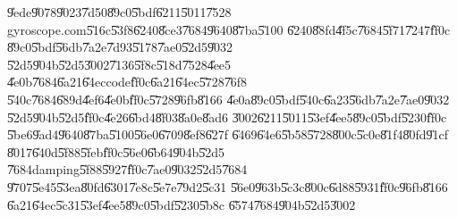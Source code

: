 \U{9ede}\U{9078}\U{9023}\U{7d50}\U{89c0}\U{5bdf}\U{6211}\U{5011}\U{7528}%
gyroscope.com\U{516c}\U{53f8}\U{6240}\U{8ce3}\U{7684}\U{9640}\U{87ba}\U{5100}%
\U{6240}\U{88fd}\U{4f5c}\U{7684}\U{5f71}\U{7247}\href{http://tinypic.com/r/2clcee/8%
}{\underline{\color{blue}}}\U{ff0c}%
\U{89c0}\U{5bdf}\U{56db}\U{7a2e}\U{7d93}\U{5178}\U{7ae0}\U{52d5}\U{9032}%
\U{52d5}\U{904b}\U{52d5}\U{3002}\U{7136}\U{5f8c}\U{518d}\U{7528}\U{4ee5}%
\U{4e0b}\U{7684}\U{6a21}\U{64ec}code\U{ff0c}\U{6a21}\U{64ec}\U{5728}\U{76f8}%
\U{540c}\U{7684}\U{689d}\U{4ef6}\U{4e0b}\U{ff0c}\U{5728}\U{96fb}\U{8166}%
\U{4e0a}\U{89c0}\U{5bdf}\U{540c}\U{6a23}\U{56db}\U{7a2e}\U{7ae0}\U{9032}%
\U{52d5}\U{904b}\U{52d5}\U{ff0c}\U{4e26}\U{6bd4}\U{8f03}\U{8a0e}\U{8ad6}%
\U{3002}\U{6211}\U{5011}\U{53ef}\U{4ee5}\U{89c0}\U{5bdf}\U{5230}\U{ff0c}%
\U{5be6}\U{9ad4}\U{9640}\U{87ba}\U{5100}\U{56e0}\U{6709}\U{8ef8}\U{627f}%
\U{6469}\U{64e6}\U{5b58}\U{5728}\U{800c}\U{5c0e}\U{81f4}\U{80fd}\U{91cf}%
\U{8017}\U{640d}\U{5f88}\U{5feb}\U{ff0c}\U{56e0}\U{6b64}\U{904b}\U{52d5}%
\U{7684}damping\U{5f88}\U{5927}\U{ff0c}\U{7ae0}\U{9032}\U{52d5}\U{7684}%
\U{9707}\U{5e45}\U{53ea}\U{80fd}\U{6301}\U{7e8c}\U{5e7e}\U{79d2}\U{5c31}%
\U{56e0}\U{963b}\U{5c3c}\U{800c}\U{6d88}\U{5931}\U{ff0c}\U{96fb}\U{8166}%
\U{6a21}\U{64ec}\U{5c31}\U{53ef}\U{4ee5}\U{89c0}\U{5bdf}\U{5230}\U{5b8c}%
\U{6574}\U{7684}\U{904b}\U{52d5}\U{3002}

%

